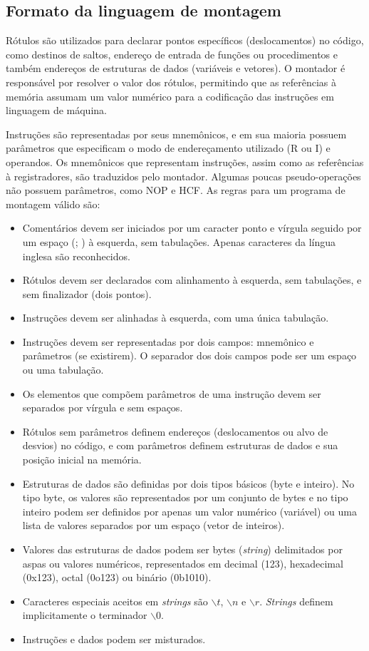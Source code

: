 \documentclass{extreport}
\begin{document}
\subsection{Formato da linguagem de montagem}

Rótulos são utilizados para declarar pontos específicos (deslocamentos) no código, como destinos de saltos, endereço de entrada de funções ou procedimentos e também endereços de estruturas de dados (variáveis e vetores). O montador é responsável por resolver o valor dos rótulos, permitindo que as referências à memória assumam um valor numérico para a codificação das instruções em linguagem de máquina.

Instruções são representadas por seus mnemônicos, e em sua maioria possuem parâmetros que especificam o modo de endereçamento utilizado (R ou I) e operandos. Os mnemônicos que representam instruções, assim como as referências à registradores, são traduzidos pelo montador. Algumas poucas pseudo-operações não possuem parâmetros, como NOP e HCF. As regras para um programa de montagem válido são:

\begin{itemize}
\item Comentários devem ser iniciados por um caracter ponto e vírgula seguido por um espaço (; ) à esquerda, sem tabulações. Apenas caracteres da língua inglesa são reconhecidos.
\item Rótulos devem ser declarados com alinhamento à esquerda, sem tabulações, e sem finalizador (dois pontos).
\item Instruções devem ser alinhadas à esquerda, com uma única tabulação.
\item Instruções devem ser representadas por dois campos: mnemônico e parâmetros (se existirem). O separador dos dois campos pode ser um espaço ou uma tabulação.
\item Os elementos que compõem parâmetros de uma instrução devem ser separados por vírgula e sem espaços.
\item Rótulos sem parâmetros definem endereços (deslocamentos ou alvo de desvios) no código, e com parâmetros definem estruturas de dados e sua posição inicial na memória.
\item Estruturas de dados são definidas por dois tipos básicos (byte e inteiro). No tipo byte, os valores são representados por um conjunto de bytes e no tipo inteiro podem ser definidos por apenas um valor numérico (variável) ou uma lista de valores separados por um espaço (vetor de inteiros).
\item Valores das estruturas de dados podem ser bytes (\textit{string}) delimitados por aspas ou valores numéricos, representados em decimal (123), hexadecimal (0x123), octal (0o123) ou binário (0b1010).
\item Caracteres especiais aceitos em \textit{strings} são $\backslash t$, $\backslash n$ e $\backslash r$. \textit{Strings} definem implicitamente o terminador \textit{$\backslash 0$}.
\item Instruções e dados podem ser misturados.
\end{itemize}
\end{document}
